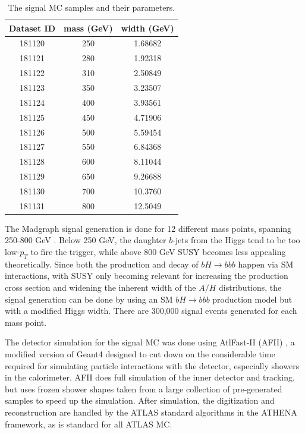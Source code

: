 


\begin{table}
   \caption{The signal MC samples and their parameters. \label{tab:sig_mc_parameters} }
    \center
    \begin{tabular}{ c c c } \hline\hline
    Dataset ID & mass (GeV) & width (GeV) \\ \hline
    181120     & 250        & 1.68682 \\
    181121     & 280        & 1.92318 \\
    181122     & 310        & 2.50849 \\
    181123     & 350        & 3.23507 \\
    181124     & 400        & 3.93561 \\
    181125     & 450        & 4.71906 \\
    181126     & 500        & 5.59454 \\
    181127     & 550        & 6.84368 \\
    181128     & 600        & 8.11044 \\
    181129     & 650        & 9.26688 \\
    181130     & 700        & 10.3760 \\
    181131     & 800        & 12.5049 \\ \hline
    \end{tabular}
\end{table}





The Madgraph signal generation is done for 12 different mass points, spanning 250-800 GeV
. Below 250 GeV, the daughter $b$-jets from the Higgs tend to be 
too low-$p_T$ to fire the trigger, while above 800 GeV SUSY 
becomes less appealing theoretically.  Since both the production and decay of $bH\rightarrow bbb$ 
happen via SM interactions, with SUSY only becoming relevant for increasing the production cross section and 
widening the inherent width of the $A/H$ distributions, the signal generation can 
be done by using an SM $bH\rightarrow bbb$ production model but with a 
modified Higgs width.  There are 300,000 signal events generated for each mass point.

The detector simulation for the signal MC was done using AtlFast-II (AFII) \cite{ATF2}, 
a modified version of Geant4 \cite{Geant4-1, Geant4-2} designed 
to cut down on the considerable time required for simulating particle interactions with the detector, especially 
showers in the calorimeter.  AFII does full simulation of the inner detector and tracking, but 
uses frozen shower shapes taken from a large collection of pre-generated samples to speed up 
the simulation.  After simulation, the digitization and reconstruction are handled by the ATLAS standard algorithms 
in the ATHENA framework, as is standard for all ATLAS MC.    




